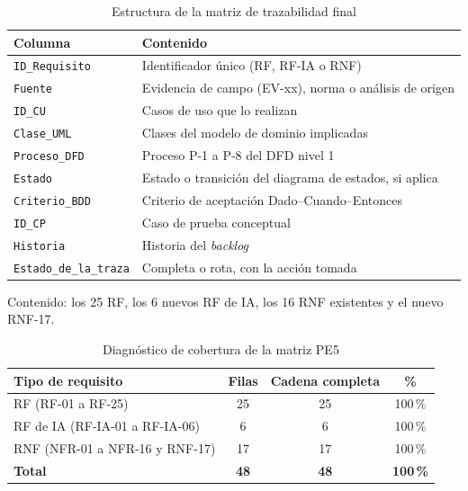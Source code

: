 \begin{table}[H]
\centering
\small
\begin{tabular}{|l|p{9.5cm}|}
\hline
\textbf{Columna} & \textbf{Contenido} \\ \hline
\texttt{ID\_Requisito} & Identificador \'unico (RF, RF-IA o RNF) \\ \hline
\texttt{Fuente} & Evidencia de campo (EV-xx), norma o an\'alisis de origen \\ \hline
\texttt{ID\_CU} & Casos de uso que lo realizan \\ \hline
\texttt{Clase\_UML} & Clases del modelo de dominio implicadas \\ \hline
\texttt{Proceso\_DFD} & Proceso P-1 a P-8 del DFD nivel 1 \\ \hline
\texttt{Estado} & Estado o transici\'on del diagrama de estados, si aplica \\ \hline
\texttt{Criterio\_BDD} & Criterio de aceptaci\'on Dado--Cuando--Entonces \\ \hline
\texttt{ID\_CP} & Caso de prueba conceptual \\ \hline
\texttt{Historia} & Historia del \emph{backlog} \\ \hline
\texttt{Estado\_de\_la\_traza} & Completa o rota, con la acci\'on tomada \\ \hline
\end{tabular}
\caption{Estructura de la matriz de trazabilidad final}
\label{tab:columnas-matriz}
\end{table}

Contenido: los 25 RF, los 6 nuevos RF de IA, los 16 RNF existentes y el nuevo RNF-17.

\begin{table}[H]
\centering
\small
\begin{tabular}{|l|c|c|c|}
\hline
\textbf{Tipo de requisito} & \textbf{Filas} & \textbf{Cadena completa} & \textbf{\%} \\ \hline
RF (RF-01 a RF-25) & 25 & 25 & 100\,\% \\ \hline
RF de IA (RF-IA-01 a RF-IA-06) & 6 & 6 & 100\,\% \\ \hline
RNF (NFR-01 a NFR-16 y RNF-17) & 17 & 17 & 100\,\% \\ \hline
\textbf{Total} & \textbf{48} & \textbf{48} & \textbf{100\,\%} \\ \hline
\end{tabular}
\caption{Diagn\'ostico de cobertura de la matriz PE5}
\label{tab:diagnostico-cobertura}
\end{table}

